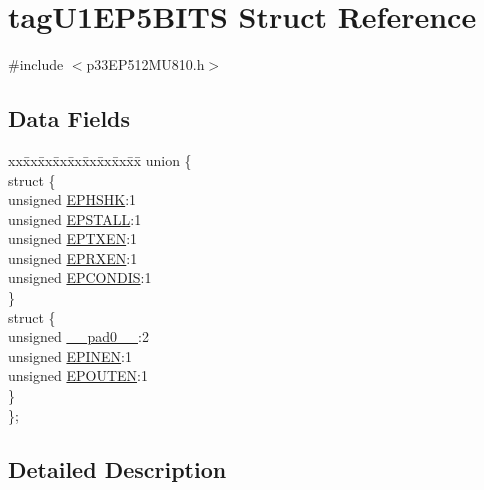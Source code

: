 \hypertarget{structtag_u1_e_p5_b_i_t_s}{}\section{tag\+U1\+E\+P5\+B\+I\+TS Struct Reference}
\label{structtag_u1_e_p5_b_i_t_s}


{\ttfamily \#include $<$p33\+E\+P512\+M\+U810.\+h$>$}

\subsection*{Data Fields}
\begin{DoxyCompactItemize}
\item 
\begin{tabbing}
xx\=xx\=xx\=xx\=xx\=xx\=xx\=xx\=xx\=\kill
union \{\\
\>struct \{\\
\>\>unsigned \hyperlink{structtag_u1_e_p5_b_i_t_s_a0d06430217cb4b189fbe9d0c4b460482}{EPHSHK}:1\\
\>\>unsigned \hyperlink{structtag_u1_e_p5_b_i_t_s_a47042104f04ebe06a23f9789bd400d7e}{EPSTALL}:1\\
\>\>unsigned \hyperlink{structtag_u1_e_p5_b_i_t_s_aa2d88c1be513e759c136823c86a355b4}{EPTXEN}:1\\
\>\>unsigned \hyperlink{structtag_u1_e_p5_b_i_t_s_a8a388d32ceffb87230e660b6793f2857}{EPRXEN}:1\\
\>\>unsigned \hyperlink{structtag_u1_e_p5_b_i_t_s_a1bd26df05d2b5a11b20ee548fce90c3e}{EPCONDIS}:1\\
\>\} \\
\>struct \{\\
\>\>unsigned \hyperlink{structtag_u1_e_p5_b_i_t_s_adf71f3d8410c1f1dbbc96680a92c49af}{\_\_pad0\_\_}:2\\
\>\>unsigned \hyperlink{structtag_u1_e_p5_b_i_t_s_a8b6d98cdf233ac90ff19d16d9a89215e}{EPINEN}:1\\
\>\>unsigned \hyperlink{structtag_u1_e_p5_b_i_t_s_adf87e8acfbb27a5626e21b3e3bd106fd}{EPOUTEN}:1\\
\>\} \\
\}; \\

\end{tabbing}\end{DoxyCompactItemize}


\subsection{Detailed Description}


